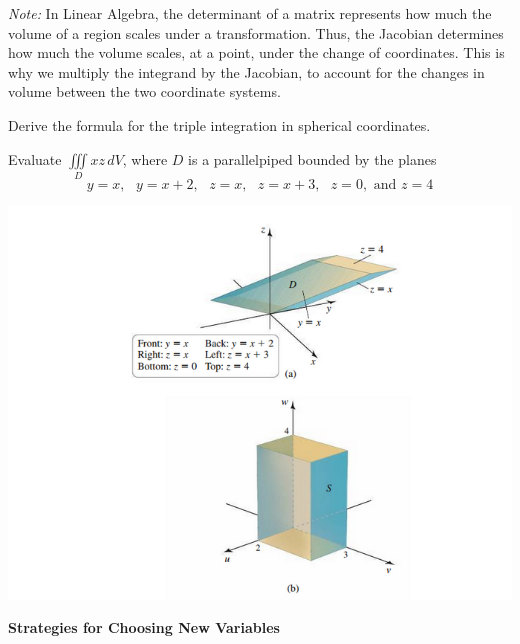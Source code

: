 \documentclass[../mathNotesPreamble]{subfiles}
\begin{document}
  \noindent
  \textit{Note:} In Linear Algebra, the determinant of a matrix represents how much the volume of a region scales under a transformation. Thus, the Jacobian determines how much the volume scales, at a point, under the change of coordinates. This is why we multiply the integrand by the Jacobian, to account for the changes in volume between the two coordinate systems.
  \pagebreak

  \begin{ex*}
    Derive the formula for the triple integration in spherical coordinates.
  \end{ex*}
  \pagebreak

  \begin{ex*}
    Evaluate $\displaystyle\iiint\limits_Dxz\,dV$, where $D$ is a parallelpiped bounded by the planes
    \[
      y=x,\text{ }y=x+2,\text{ }z=x,\text{ }z=x+3,\text{ }z=0,\text{ and }z=4
    \]
  \end{ex*}
  \begin{flushleft}
    \includegraphics[width=.75\linewidth]{../images/briggs_16_07/fig16_83}
  \end{flushleft}
  \pagebreak

  \noindent
  \textbf{Strategies for Choosing New Variables}
  \vspace*{\baselineskip}
\end{document}
